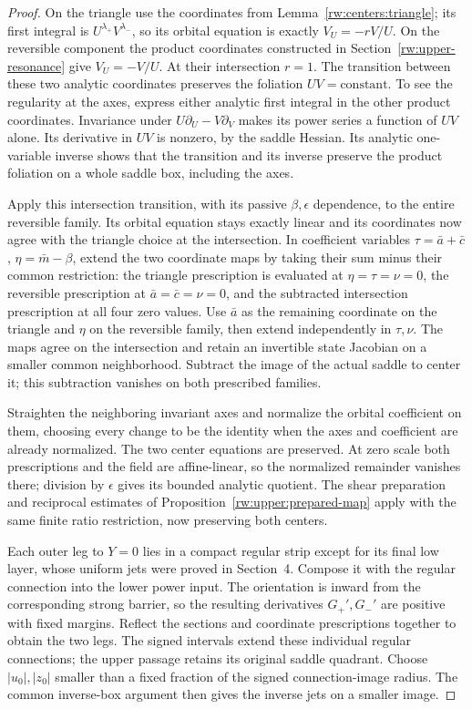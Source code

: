 \begin{proof}
On the triangle use the coordinates from
Lemma~\ref{rw:centers:triangle}; its first integral is
$U^{\lambda_+}V^{\lambda_-}$, so its orbital equation is exactly
$V_U=-rV/U$. On the reversible component the product coordinates
constructed in Section~\ref{rw:upper-resonance} give $V_U=-V/U$.
At their intersection $r=1$. The transition between these two analytic
coordinates preserves the foliation $UV=\text{constant}$. To see the
regularity at the axes, express either analytic first integral in the
other product coordinates. Invariance under
$U\partial_U-V\partial_V$ makes its power series a function of
$UV$ alone. Its derivative in $UV$ is nonzero, by the saddle Hessian.
Its analytic one-variable inverse shows that the transition and its
inverse preserve the product foliation on a whole saddle box,
including the axes.

Apply this intersection transition, with its passive $\beta,\epsilon$
dependence, to the entire reversible family. Its orbital equation stays
exactly linear and its coordinates now agree with the triangle choice
at the intersection. In coefficient variables
$\tau=\bar a+\bar c$, $\eta=\bar m-\beta$, extend the two
coordinate maps by taking their sum minus their common restriction:
the triangle prescription is evaluated at $\eta=\tau=\nu=0$,
the reversible prescription at $\bar a=\bar c=\nu=0$, and the
subtracted intersection prescription at all four zero values.
Use $\bar a$ as the remaining coordinate on the triangle and $\eta$
on the reversible family, then extend independently in $\tau,\nu$.
The maps agree on the intersection and retain an invertible state
Jacobian on a smaller common neighborhood. Subtract the image of the
actual saddle to center it; this subtraction vanishes on both prescribed
families.

Straighten the neighboring invariant axes and normalize the orbital
coefficient on them, choosing every change to be the identity when the
axes and coefficient are already normalized. The two center equations
are preserved. At zero scale both prescriptions and the field are
affine-linear, so the normalized remainder vanishes there; division
by $\epsilon$ gives its bounded analytic quotient. The shear
preparation and reciprocal estimates of
Proposition~\ref{rw:upper:prepared-map} apply with the same finite
ratio restriction, now preserving both centers.

Each outer leg to $Y=0$ lies in a compact regular strip except for
its final low layer, whose uniform jets were proved in Section~4.
Compose it with the regular connection into the lower power input.
The orientation is inward from the corresponding strong barrier, so
the resulting derivatives $G_+',G_-'$ are positive with fixed margins.
Reflect the sections and coordinate prescriptions together to obtain
the two legs. The signed intervals extend these individual regular
connections; the upper passage retains its original saddle quadrant.
Choose $|u_0|,|z_0|$ smaller than a fixed fraction of the signed
connection-image radius. The common inverse-box argument then gives
the inverse jets on a smaller image.
\end{proof}
